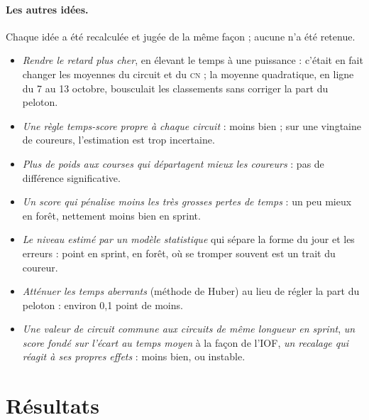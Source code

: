 \documentclass[11pt,a4paper]{article}
\newcommand{\CN}{\textsc{cn}}
\begin{document}
\paragraph{Les autres idées.} Chaque idée a été recalculée et jugée de la même façon ; aucune n'a été retenue.
\begin{itemize}
  \item \emph{Rendre le retard plus cher}, en élevant le temps à une puissance : c'était en fait changer les moyennes du circuit et du \CN{} ; la moyenne quadratique, en ligne du 7 au 13 octobre, bousculait les classements sans corriger la part du peloton.
  \item \emph{Une règle temps-score propre à chaque circuit} : moins bien ; sur une vingtaine de coureurs, l'estimation est trop incertaine.
  \item \emph{Plus de poids aux courses qui départagent mieux les coureurs} : pas de différence significative.
  \item \emph{Un score qui pénalise moins les très grosses pertes de temps} : un peu mieux en forêt, nettement moins bien en sprint.
  \item \emph{Le niveau estimé par un modèle statistique} qui sépare la forme du jour et les erreurs : \NmleS{} point en sprint, \NmleF{} en forêt, où se tromper souvent est un trait du coureur.
  \item \emph{Atténuer les temps aberrants} (méthode de Huber) au lieu de régler la part du peloton : environ 0,1 point de moins.
  \item \emph{Une valeur de circuit commune aux circuits de même longueur en sprint}, \emph{un score fondé sur l'écart au temps moyen} à la façon de l'IOF, \emph{un recalage qui réagit à ses propres effets} : moins bien, ou instable.
\end{itemize}

\section{Résultats}
\end{document}
